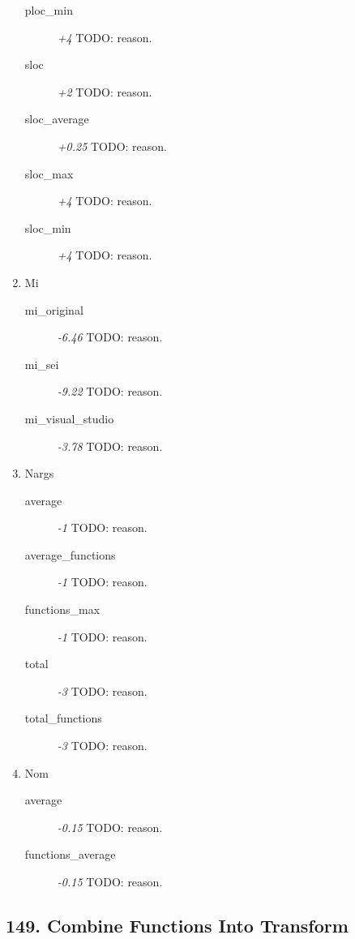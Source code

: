 \begin{enumerate}
\begin{description}
          \item [ploc\_min] \textit{+4} TODO: reason.
          \item [sloc] \textit{+2} TODO: reason.
          \item [sloc\_average] \textit{+0.25} TODO: reason.
          \item [sloc\_max] \textit{+4} TODO: reason.
          \item [sloc\_min] \textit{+4} TODO: reason.
        \end{description}
  \item Mi
        \begin{description}
          \item [mi\_original] \textit{-6.46} TODO: reason.
          \item [mi\_sei] \textit{-9.22} TODO: reason.
          \item [mi\_visual\_studio] \textit{-3.78} TODO: reason.
        \end{description}
  \item Nargs
        \begin{description}
          \item [average] \textit{-1} TODO: reason.
          \item [average\_functions] \textit{-1} TODO: reason.
          \item [functions\_max] \textit{-1} TODO: reason.
          \item [total] \textit{-3} TODO: reason.
          \item [total\_functions] \textit{-3} TODO: reason.
        \end{description}
  \item Nom
        \begin{description}
          \item [average] \textit{-0.15} TODO: reason.
          \item [functions\_average] \textit{-0.15} TODO: reason.
        \end{description}
\end{enumerate}
\subsection{149. Combine Functions Into Transform}

